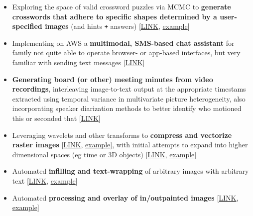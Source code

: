 \documentclass[12pt]{article}
\begin{document}
\begin{itemize}[noitemsep]

\item Exploring the space of valid crossword puzzles via MCMC to \textbf{generate crosswords that adhere to specific shapes determined by a user-specified images} (and hints  \texttt{+} answers) [\href{https://github.com/NikVetr/crossword}{LINK}, \href{https://drive.google.com/file/d/1E60FUROV3jh9OK-eIIt5cu\_z9CEeDO66}{example}]

\item Implementing on AWS a \textbf{multimodal, SMS-based chat assistant} for family not quite able to operate browser- or app-based interfaces, but very familiar with sending text messages [\href{https://github.com/NikVetr/minor\_scripts/blob/master/postdoc/email\_gma\_chatGPT-clone.py}{LINK}]

\item \textbf{Generating board (or other) meeting minutes from video recordings}, interleaving image-to-text output at the appropriate timestams extracted using temporal variance in multivariate picture heterogeneity, also incorporating speaker diarization methods to better identify who motioned this or seconded that [\href{https://github.com/NikVetr/minor\_scripts/blob/master/postdoc/generate\_meeting\_minutes.py}{LINK}]

\item Leveraging wavelets and other transforms to \textbf{compress and vectorize raster images} [\href{https://github.com/NikVetr/minor\_scripts/blob/c8926965b0c6dd9158351cf5836cbc76261f6830/postdoc/vectorize\_raster\_image.R}{LINK}, \href{https://drive.google.com/file/d/1rrEjdL13qZZIi22Pe5IkbUJKjPmpPpP5}{example}], with initial attempts to expand into higher dimensional spaces (eg time or 3D objects) [\href{https://github.com/NikVetr/minor\_scripts/blob/c8926965b0c6dd9158351cf5836cbc76261f6830/postdoc/interpolate\_signature\_frequency\_series.R}{LINK}, \href{https://drive.google.com/file/d/1IDgm04h0LEZc4IXOPjqBheifsz2Y6ZmW}{example}]

\item Automated \textbf{infilling and text-wrapping} of arbitrary images with arbitrary text [\href{https://github.com/NikVetr/minor\_scripts/blob/c8926965b0c6dd9158351cf5836cbc76261f6830/postdoc/text\_to\_image.R}{LINK}, \href{https://drive.google.com/file/d/1cedbUpq8ArDd4fnjxUZBHlSLuVqsI7UO}{example}]

\item Automated \textbf{processing and overlay of in/outpainted images} [\href{https://github.com/NikVetr/minor\_scripts/blob/c8926965b0c6dd9158351cf5836cbc76261f6830/postdoc/dall-e2\_zoomout.R}{LINK}, \href{https://drive.google.com/file/d/1nuvGY8d3h9qYeh9NrWVbo9ybkt0RdORn}{example}]


\end{itemize}
\end{document}
